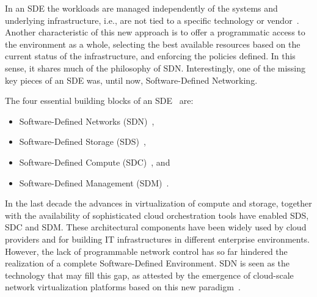 In an SDE the workloads are managed independently of the systems and underlying infrastructure, i.e., are not tied to a specific technology or vendor~\cite{li2014,racherla2014}.
Another characteristic of this new approach is to offer a programmatic access to the environment as a whole, selecting the best available resources based on the current status of the infrastructure, and enforcing the policies defined.
In this sense, it shares much of the philosophy of SDN.
Interestingly, one of the missing key pieces of an SDE was, until now, Software-Defined Networking.

The four essential building blocks of an SDE~\cite{li2014,racherla2014,arnold2014} are:

\begin{itemize}
\item Software-Defined Networks (SDN)~\cite{dixon2014,ibmsystemsandtechnologygroup2014},
\item Software-Defined Storage (SDS)~\cite{alba2014},
\item Software-Defined Compute (SDC)~\cite{racherla2014}, and 
\item Software-Defined Management (SDM)~\cite{ibmsystems2014}.
\end{itemize}

In the last decade the advances in virtualization of compute and storage, together with the availability of sophisticated cloud orchestration tools have enabled SDS, SDC and SDM.
These architectural components have been widely used by cloud providers and for building IT infrastructures in different enterprise environments.
However, the lack of programmable network control has so far hindered the realization of a complete Software-Defined Environment.
SDN is seen as the technology that may fill this gap, as attested by the emergence of cloud-scale network virtualization platforms based on this new paradigm~\cite{koponen}.




